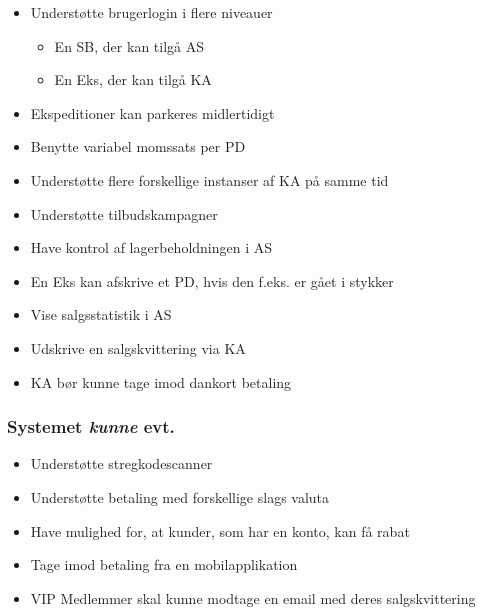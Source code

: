 \begin{itemize}

\item Understøtte brugerlogin i flere niveauer
\begin{itemize}
\item En \gls{SB}, der kan tilgå \gls{AS}\\
\item En \gls{Eks}, der kan tilgå \gls{KA}
\end{itemize}
\item Ekspeditioner kan parkeres midlertidigt
\item Benytte variabel momssats per \gls{PD}
\item Understøtte flere forskellige instanser af \gls{KA} på samme tid
\item Understøtte tilbudskampagner
\item Have kontrol af lagerbeholdningen i \gls{AS}
\item En \gls{Eks} kan afskrive et \gls{PD}, hvis den f.eks. er gået i stykker
\item Vise salgsstatistik i \gls{AS}
\item Udskrive en salgskvittering via \gls{KA}
\item \gls{KA} bør kunne tage imod dankort betaling

\end{itemize}


\subsubsection*{Systemet \textit{kunne} evt.}

\begin{itemize}

\item Understøtte stregkodescanner
\item Understøtte betaling med forskellige slags valuta
\item Have mulighed for, at kunder, som har en konto, kan få rabat
\item Tage imod betaling fra en mobilapplikation
\item VIP Medlemmer skal kunne modtage en email med deres salgskvittering

\end{itemize}